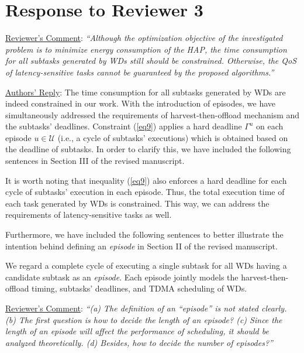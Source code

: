 \documentclass[12pt,draftclsnofoot,onecolumn]{IEEEtran}
\newcommand{\rev}[1]{{\color{blue}#1}} %
\newcommand{\rev}[1]{#1}
\newenvironment{my}[2]%
{\begin{list}{}%
{\setlength{\rightmargin}{#1}\setlength{\leftmargin}{#2}}%


 \item[]{}

} {\end{list}}
\begin{document}
\section{Response to Reviewer 3}
\begin{enumerate}

\item \underline{Reviewer's Comment}: \textit{``Although the optimization objective of the investigated problem is to minimize energy consumption of the HAP, the time consumption for all subtasks generated by WDs still should be constrained. Otherwise, the QoS of latency-sensitive tasks cannot be guaranteed by the proposed algorithms.''} \newline

\underline{Authors' Reply}: The time consumption for all subtasks generated by WDs are indeed constrained in our work. With the introduction of episodes, we have simultaneously addressed the requirements of harvest-then-offload mechanism and the subtasks' deadlines. Constraint (\ref{eq9}) applies a hard deadline $\Gamma^u$ on each episode $u\in\mathcal{U}$ (i.e., a cycle of subtasks' executions) which is obtained based on the deadline of subtasks. In order to clarify this, we have included the following sentences in Section III of the revised manuscript. \newline

\begin{my}{1cm}{1cm}
\rev{	
	It is worth noting that inequality (\ref{eq9}) also enforces a hard deadline for each cycle of subtasks' execution in each episode. Thus, the total execution time of each task generated by WDs is constrained. This way, we can address the requirements of latency-sensitive tasks as well.
}\newline
\end{my}

Furthermore, we have included the following sentences to better illustrate the intention behind defining an \textit{episode} in Section II of the revised manuscript.\\

\begin{my}{1cm}{1cm}
	\rev{We regard a complete cycle of executing a single subtask for all WDs having a candidate subtask as an \textit{episode}. Each episode jointly models the harvest-then-offload timing, subtasks' deadlines, and TDMA scheduling of WDs.
	}\newline
\end{my}

\item \underline{Reviewer's Comment}: \textit {``(a) The definition of an “episode” is not stated clearly. (b) The first question is how to decide the length of an episode? (c) Since the length of an episode will affect the performance of scheduling, it should be analyzed theoretically. (d) Besides, how to decide the number of episodes?''} \newline


\end{enumerate}
\end{document}

